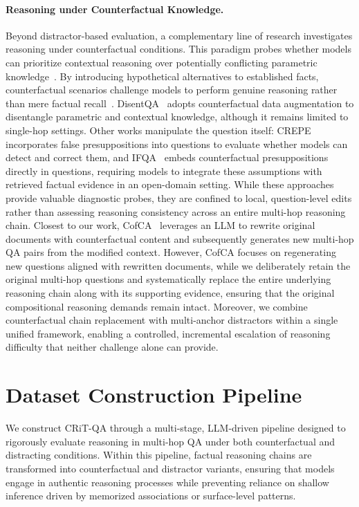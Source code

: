 \documentclass[10pt, a4paper]{article}
\begin{document}
\paragraph{Reasoning under Counterfactual Knowledge.}
Beyond distractor-based evaluation, a complementary line of research investigates reasoning under counterfactual conditions. This paradigm probes whether models can prioritize contextual reasoning over potentially conflicting parametric knowledge~\cite{frohberg-binder-2022-crass}. By introducing hypothetical alternatives to established facts, counterfactual scenarios challenge models to perform genuine reasoning rather than mere factual recall~\cite{chen2025counterbenchbenchmarkcounterfactualsreasoning}. DisentQA~\cite{neeman-etal-2023-disentqa} adopts counterfactual data augmentation to disentangle parametric and contextual knowledge, although it remains limited to single-hop settings. Other works manipulate the question itself: CREPE~\cite{yu-etal-2023-crepe} incorporates false presuppositions into questions to evaluate whether models can detect and correct them, and IFQA~\cite{yu-etal-2023-ifqa} embeds counterfactual presuppositions directly in questions, requiring models to integrate these assumptions with retrieved factual evidence in an open-domain setting. While these approaches provide valuable diagnostic probes, they are confined to local, question-level edits rather than assessing reasoning consistency across an entire multi-hop reasoning chain. Closest to our work, CofCA~\cite{wucofca} leverages an LLM to rewrite original documents with counterfactual content and subsequently generates new multi-hop QA pairs from the modified context. However, CofCA focuses on regenerating new questions aligned with rewritten documents, while we deliberately retain the original multi-hop questions and systematically replace the entire underlying reasoning chain along with its supporting evidence, ensuring that the original compositional reasoning demands remain intact. Moreover, we combine counterfactual chain replacement with multi-anchor distractors within a single unified framework, enabling a controlled, incremental escalation of reasoning difficulty that neither challenge alone can provide.


\section{Dataset Construction Pipeline}


We construct CRiT-QA through a multi-stage, LLM-driven pipeline designed to rigorously evaluate reasoning in multi-hop QA under both counterfactual and distracting conditions. Within this pipeline, factual reasoning chains are transformed into counterfactual and distractor variants, ensuring that models engage in authentic reasoning processes while preventing reliance on shallow inference driven by memorized associations or surface-level patterns.
 
\end{document}
